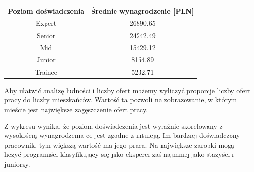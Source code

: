 \documentclass{article}
\begin{document}
\begin{table}[!hbt]
    \centering
    \begin{tabular}{|c|c|}
        \hline
        \textbf{Poziom doświadczenia} & \textbf{Średnie wynagrodzenie [PLN]} \\ \hline
        Expert                        & 26890.65                             \\ \hline
        Senior                        & 24242.49                             \\ \hline
        Mid                           & 15429.12                             \\ \hline
        Junior                        & 8154.89                              \\ \hline
        Trainee                       & 5232.71                              \\ \hline
    \end{tabular}
\end{table}

Aby ułatwić analizę ludności i liczby ofert możemy wyliczyć proporcje liczby ofert pracy do liczby mieszkańców.
Wartość ta pozwoli na zobrazowanie, w którym mieście jest największe zagęszczenie ofert pracy.

Z wykresu wynika, że poziom doświadczenia jest wyraźnie skorelowany z wysokością wynagrodzenia co jest zgodne z intuicją.
Im bardziej doświadczony pracownik, tym większą wartość ma jego praca.
Na największe zarobki mogą liczyć programiści klasyfikujący się jako eksperci zaś najmniej jako stażyści i juniorzy.
\end{document}
